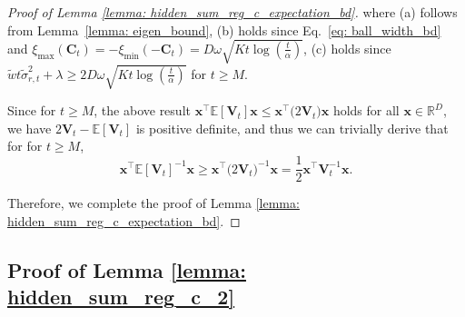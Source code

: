 \begin{proof}[Proof of Lemma \ref{lemma: hidden_sum_reg_c_expectation_bd}]
where (a) follows from Lemma~\ref{lemma: eigen_bound}, (b) holds since Eq.~\ref{eq: ball_width_bd} and $\xi_{\max} \left(\boldsymbol{C}_t \right) = -\xi_{\min} \left(-\boldsymbol{C}_t \right) = D \omega \sqrt{ K t \log \left( \frac{t}{\alpha} \right)}$, (c) holds since $\tilde{w} t \tilde{\sigma}^2_{r,t} + \lambda \geq 2 D \omega \sqrt{ K t \log \left( \frac{t}{\alpha} \right)} $ for $t \geq M$.

Since for $t \geq M$, the above result $\boldsymbol{x}^{\top} 
\mathbb{E} [\boldsymbol{V}_t]
\boldsymbol{x} \leq \boldsymbol{x}^{\top} \big( 2\boldsymbol{V}_t \big) \boldsymbol{x}$ holds for all $\boldsymbol{x} \in \mathbb{R}^{D}$, we have $2\boldsymbol{V}_t - \mathbb{E} [\boldsymbol{V}_t]$ is positive definite, and thus we can trivially derive that for for $t \geq M$,
\[
\boldsymbol{x}^{\top} 
\mathbb{E} [\boldsymbol{V}_t]^{-1}
\boldsymbol{x} 
\geq
\boldsymbol{x}^{\top} \big( 2\boldsymbol{V}_t \big)^{-1} \boldsymbol{x} 
= 
\frac{1}{2} \boldsymbol{x}^{\top} \boldsymbol{V}_t^{-1} \boldsymbol{x}.
\]

Therefore, we complete the proof of Lemma \ref{lemma: hidden_sum_reg_c_expectation_bd}.
\end{proof}



\subsection{Proof of Lemma \ref{lemma: hidden_sum_reg_c_2}}
\label{sec: proof_lemma_hidden_sum_reg_c_2}


